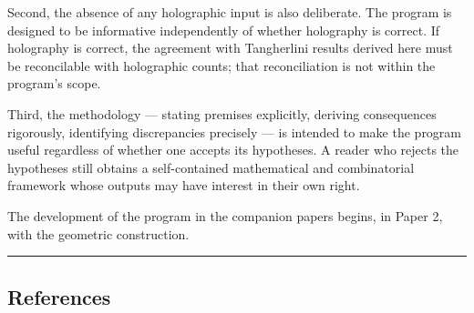 \documentclass[a4paper,11pt]{article}
\theoremstyle{definition}
\begin{document}
Second, the absence of any holographic input is also deliberate. The
program is designed to be informative independently of whether
holography is correct. If holography is correct, the agreement with
Tangherlini results derived here must be reconcilable with holographic
counts; that reconciliation is not within the program's scope.

Third, the methodology --- stating premises explicitly, deriving
consequences rigorously, identifying discrepancies precisely --- is
intended to make the program useful regardless of whether one accepts
its hypotheses. A reader who rejects the hypotheses still obtains a
self-contained mathematical and combinatorial framework whose outputs
may have interest in their own right.

The development of the program in the companion papers begins, in Paper
2, with the geometric construction.

\begin{center}\rule{0.5\linewidth}{0.5pt}\end{center}

\subsection{References}\label{references}
\end{document}
